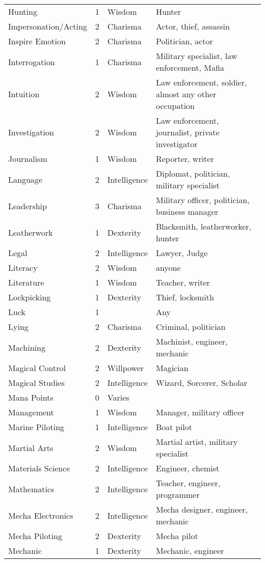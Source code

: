 \documentclass[twoside]{book}
\begin{document}
\begin{longtable}{p{1.25in}llp{12em}}
           \tabularnewline
      \raggedright Hunting & 1 & Wisdom & Hunter \tabularnewline
      \raggedright Impersonation/Acting & 2 & Charisma & Actor, thief, assassin
           \tabularnewline
      \raggedright Inspire Emotion & 2 & Charisma & Politician, actor
           \tabularnewline
      \raggedright Interrogation & 1 & Charisma & Military specialist, law
           enforcement, Mafia \tabularnewline
      \raggedright Intuition & 2 & Wisdom & Law enforcement, soldier,
           almost any other occupation \tabularnewline
      \raggedright Investigation & 2 & Wisdom & Law enforcement,
           journalist, private investigator \tabularnewline
      \raggedright Journalism & 1 & Wisdom & Reporter, writer \tabularnewline
      \raggedright Language & 2 & Intelligence & Diplomat, politician,
           military specialist \tabularnewline
      \raggedright Leadership & 3 & Charisma & Military officer,
           politician, business manager \tabularnewline
      \raggedright Leatherwork & 1 & Dexterity & Blacksmith,
           leatherworker, hunter \tabularnewline
      \raggedright Legal & 2 & Intelligence & Lawyer, Judge \tabularnewline
      \raggedright Literacy & 2 & Wisdom & anyone \tabularnewline
      \raggedright Literature & 1 & Wisdom & Teacher, writer \tabularnewline
      \raggedright Lockpicking & 1 & Dexterity & Thief, locksmith \tabularnewline
      \raggedright Luck & 1 &  & Any \tabularnewline
      \raggedright Lying & 2 & Charisma & Criminal, politician
           \tabularnewline
      \raggedright Machining & 2 & Dexterity & Machinist, engineer,
           mechanic \tabularnewline
      \raggedright Magical Control & 2 & Willpower & Magician \tabularnewline
      \raggedright Magical Studies & 2 & Intelligence & Wizard, Sorcerer, Scholar
           \tabularnewline
      \raggedright Mana Points & 0 & Varies &\tabularnewline
      \raggedright Management & 1 & Wisdom & Manager, military officer
           \tabularnewline
      \raggedright Marine Piloting & 1 & Intelligence & Boat pilot \tabularnewline
      \raggedright Martial Arts & 2 & Wisdom & Martial artist, military
           specialist \tabularnewline
      \raggedright Materials Science & 2 & Intelligence & Engineer, chemist
           \tabularnewline
      \raggedright Mathematics & 2 & Intelligence & Teacher, engineer,
           programmer \tabularnewline
      \raggedright Mecha Electronics & 2 & Intelligence & Mecha designer, engineer,
           mechanic \tabularnewline
      \raggedright Mecha Piloting & 2 & Dexterity & Mecha pilot \tabularnewline
      \raggedright Mechanic & 1 & Dexterity & Mechanic, engineer

\end{longtable}
\end{document}
